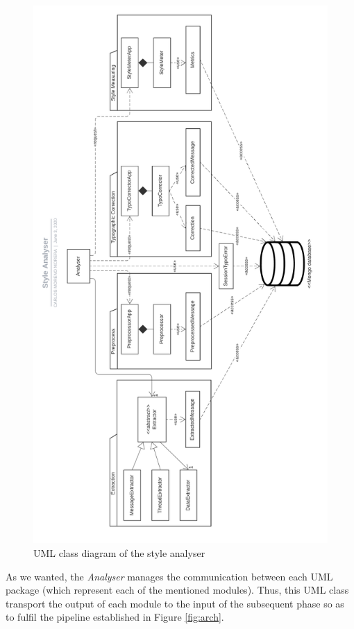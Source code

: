 \begin{figure}[p]
	\centering%
	\includegraphics[height=0.85\paperheight]{Imagenes/Bitmap/Analyser/StyleAnalyserUML.png}%
	\caption{UML class diagram of the style analyser}%
	\label{fig:umlarch}
\end{figure}

As we wanted, the \textit{Analyser} manages the communication between each UML package (which represent each of the mentioned modules). Thus, this UML class transport the output of each module to the input of the subsequent phase so as to fulfil the pipeline established in Figure \ref{fig:arch}.

